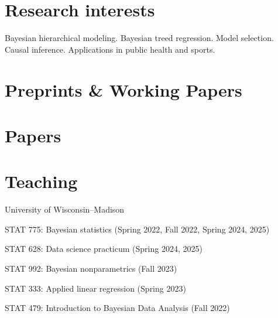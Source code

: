 \documentclass[10pt]{article}
\renewenvironment{itemize}{
  \begin{list}{}{
    \setlength{\leftmargin}{1.5em}
  }
}{
  \end{list}
}
\begin{document}
\section*{Research interests}
\begin{itemize}
\item{Bayesian hierarchical modeling. Bayesian treed regression. Model selection. Causal inference. Applications in public health and sports.}
\end{itemize}

\section*{Preprints \& Working Papers}
\begin{refsection}[preprint]
\nocite{*}
\printbibliography[heading=none]
\end{refsection}

\section*{Papers}
\begin{refsection}[pubs]
\nocite{*}
\printbibliography[heading=none]
\end{refsection}

\section*{Teaching}

\begin{itemize}
\item{University of Wisconsin--Madison}
\begin{itemize}
\item{STAT 775: Bayesian statistics (Spring 2022, Fall 2022, Spring 2024, 2025)}
\item{STAT 628: Data science practicum (Spring 2024, 2025)}
\item{STAT 992: Bayesian nonparametrics (Fall 2023)}
\item{STAT 333: Applied linear regression (Spring 2023)}
\item{STAT 479: Introduction to Bayesian Data Analysis (Fall 2022)}
\end{itemize}
\end{itemize}
\end{document}

